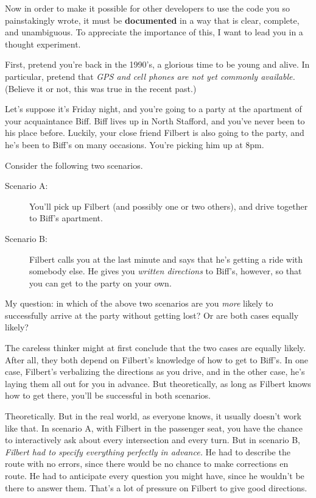 Now in order to make it possible for other developers to use the code you so
painstakingly wrote, it must be \textbf{documented} in a way that is clear,
complete, and unambiguous. To appreciate the importance of this, I want to
lead you in a thought experiment.

First, pretend you're back in the 1990's, a glorious time to be young and
alive. In particular, pretend that \textit{GPS and cell phones are not yet
commonly available.} (Believe it or not, this was true in the recent past.)

Let's suppose it's Friday night, and you're going to a party at the apartment
of your acquaintance Biff. Biff lives up in North Stafford, and you've never
been to his place before. Luckily, your close friend Filbert is also going to
the party, and he's been to Biff's on many occasions. You're picking him up at
8pm.

Consider the following two scenarios.

\begin{description}

\item[Scenario A:] You'll pick up Filbert (and possibly one or two others), and
drive together to Biff's apartment.

\item[Scenario B:] Filbert calls you at the last minute and says that he's
getting a ride with somebody else. He gives you \textit{written directions} to
Biff's, however, so that you can get to the party on your own.

\end{description}

My question: in which of the above two scenarios are you \textit{more} likely
to successfully arrive at the party without getting lost? Or are both cases
equally likely?

The careless thinker might at first conclude that the two cases are equally
likely. After all, they both depend on Filbert's knowledge of how to get to
Biff's. In one case, Filbert's verbalizing the directions as you drive, and in
the other case, he's laying them all out for you in advance. But
theoretically, as long as Filbert knows how to get there, you'll be successful
in both scenarios.

Theoretically. But in the real world, as everyone knows, it usually doesn't
work like that. In scenario A, with Filbert in the passenger seat, you have the
chance to interactively ask about every intersection and every turn. But in
scenario B, \textit{Filbert had to specify everything perfectly in advance.}
He had to describe the route with no errors, since there would be no chance to
make corrections en route. He had to anticipate every question you might have,
since he wouldn't be there to answer them. That's a lot of pressure on Filbert
to give good directions.

